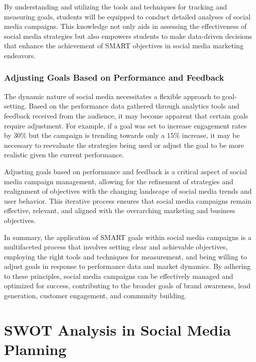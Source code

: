 \documentclass[
]{book}
\begin{document}
By understanding and utilizing the tools and techniques for tracking and measuring goals, students will be equipped to conduct detailed analyses of social media campaigns. This knowledge not only aids in assessing the effectiveness of social media strategies but also empowers students to make data-driven decisions that enhance the achievement of SMART objectives in social media marketing endeavors.

\hypertarget{adjusting-goals-based-on-performance-and-feedback}{%
\subsection*{Adjusting Goals Based on Performance and Feedback}\label{adjusting-goals-based-on-performance-and-feedback}}

The dynamic nature of social media necessitates a flexible approach to goal-setting. Based on the performance data gathered through analytics tools and feedback received from the audience, it may become apparent that certain goals require adjustment. For example, if a goal was set to increase engagement rates by 30\% but the campaign is trending towards only a 15\% increase, it may be necessary to reevaluate the strategies being used or adjust the goal to be more realistic given the current performance.

Adjusting goals based on performance and feedback is a critical aspect of social media campaign management, allowing for the refinement of strategies and realignment of objectives with the changing landscape of social media trends and user behavior. This iterative process ensures that social media campaigns remain effective, relevant, and aligned with the overarching marketing and business objectives.

In summary, the application of SMART goals within social media campaigns is a multifaceted process that involves setting clear and achievable objectives, employing the right tools and techniques for measurement, and being willing to adjust goals in response to performance data and market dynamics. By adhering to these principles, social media campaigns can be effectively managed and optimized for success, contributing to the broader goals of brand awareness, lead generation, customer engagement, and community building.

\hypertarget{swot-analysis-in-social-media-planning}{%
\chapter{SWOT Analysis in Social Media Planning}\label{swot-analysis-in-social-media-planning}}
\end{document}
